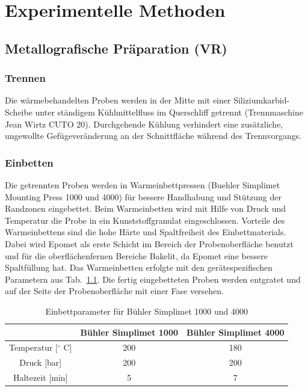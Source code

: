 \chapter{Experimentelle Methoden}

\section {Metallografische Präparation (VR)}

\subsection*{Trennen}

Die wärmebehandelten Proben werden in der Mitte mit einer Siliziumkarbid-Scheibe unter ständigem Kühlmittelfluss im Querschliff getrennt (Trennmaschine Jean Wirtz CUTO 20). Durchgehende Kühlung  verhindert eine zusätzliche, ungewollte Gefügeveränderung an der Schnittfläche während des Trennvorgangs.


\subsection*{Einbetten}

Die getrennten Proben werden in Warmeinbettpressen (Buehler Simplimet Mounting Press 1000 und 4000) für bessere Handhabung und Stützung der Randzonen eingebettet. Beim Warmeinbetten wird mit Hilfe von Druck und Temperatur die Probe in ein Kunststoffgranulat eingeschlossen. Vorteile des Warmeinbettens sind die hohe Härte und Spaltfreiheit des Einbettmaterials. Dabei wird Epomet als erste Schicht im Bereich der Probenoberfläche benutzt und für die oberflächenfernen Bereiche Bakelit, da Epomet eine bessere Spaltfüllung hat. Das Warmeinbetten erfolgte mit den gerätespezifischen Parametern aus Tab.~\ref{tab:Einbettpressen}. 
Die fertig eingebetteten Proben werden entgratet und auf der Seite der Probenoberfläche mit einer Fase versehen.  


\begin{table}
	\centering
	\begin{tabular} {|c|c|c|}
		\hline
		&Bühler Simplimet 1000 & Bühler Simplimet 4000 \\
		\hline
		Temperatur [$^\circ$ C]&200&180 \\
		\hline
		Druck [bar]&200&200 \\
		\hline
		Haltezeit [min]&5&7 \\
		\hline
		
	\end{tabular}
	
	\caption{Einbettparameter für Bühler Simplimet 1000 und 4000}
	\label{tab:Einbettpressen}
\end{table}

